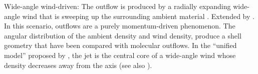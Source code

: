 \documentclass[12pt]{mythesis}
\begin{document}
Wide-angle wind-driven:
The outflow is produced by a radially expanding wide-angle wind that is sweeping up the surrounding ambient material \citep{shu1991, shu2000}. Extended by \citep{li1996, matzner1999}. In this scenario, outflows are a purely momentum-driven phenomenon. The angular distribution of the ambient density and wind density, produce a shell geometry that have been compared with molecular outflows. In the ``unified model'' proposed by \citet{shang2006}, the jet is the central core of a wide-angle wind whose density decreases away from the axis (see also \citep{shang2020, shang2023}).


\end{document}
